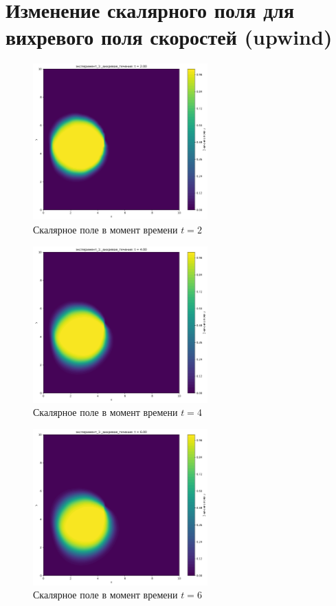 \chapter{Изменение скалярного поля  для вихревого поля скоростей (upwind)}
\label{app:vortex_df}

\begin{figure}[h]
	\centering
	\includegraphics[width=0.6\textwidth]{imgs/эксперимент_1:_вихревое_течение_t2.00.png}
	\caption{Скалярное поле в момент времени $t=2$ }
\end{figure}
\begin{figure}[h]
	\centering
	\includegraphics[width=0.6\textwidth]{imgs/эксперимент_1:_вихревое_течение_t4.00.png}
	\caption{Скалярное поле в момент времени $t=4$ }
\end{figure}
\begin{figure}[h]
	\centering
	\includegraphics[width=0.6\textwidth]{imgs/эксперимент_1:_вихревое_течение_t6.00.png}
	\caption{Скалярное поле в момент времени $t=6$ }
\end{figure}
